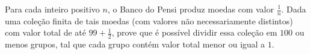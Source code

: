 Para cada inteiro positivo $n$, o Banco do Pensi produz moedas com valor $\frac{1}{n}$.
Dada uma coleção finita de tais moedas (com valores não necessariamente distintos) com valor total de até $99+\frac12$, prove que é possível dividir essa coleção em $100$ ou menos grupos, tal que cada grupo contém valor total menor ou igual a $1$.
